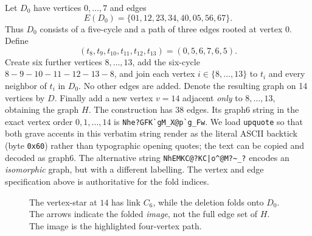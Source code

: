 \documentclass[11pt,letterpaper]{article}
\theoremstyle{definition}
\theoremstyle{remark}
\begin{document}
Let \(D_0\) have vertices \(0,\ldots,7\) and edges
\[
 E(D_0)=\{01,12,23,34,40,05,56,67\}.
\]
Thus \(D_0\) consists of a five-cycle and a path of three edges rooted at vertex \(0\). Define
\[
 (t_8,t_9,t_{10},t_{11},t_{12},t_{13})=(0,5,6,7,6,5).
\]
Create six further vertices \(8,\ldots,13\), add the six-cycle \(8-9-10-11-12-13-8\), and join each vertex \(i\in\{8,\ldots,13\}\) to \(t_i\) and every neighbor of \(t_i\) in \(D_0\). No other edges are added. Denote the resulting graph on 14 vertices by \(D\). Finally add a new vertex \(v=14\) adjacent \emph{only} to \(8,\ldots,13\), obtaining the graph \(H\). The construction has \(38\) edges. Its graph6 string in the exact vertex
order \(0,1,\ldots,14\) is \verb!Nhe?GFK`gM_X@p`g_Fw!.
We load \texttt{upquote} so that both grave accents in this
verbatim string render as the literal ASCII backtick (byte \texttt{0x60})
rather than typographic opening quotes; the text can be copied and
decoded as graph6.
The alternative string \verb!NhEMKC@?KC|o^@M?~_?! encodes an
\emph{isomorphic} graph, but with a different labelling. The vertex
and edge specification above is authoritative for the fold indices.

\begin{figure}[htbp]
\centering
{}
\caption{The vertex-star at \(14\) has link \(C_6\), while the deletion folds onto \(D_0\). The arrows indicate the folded \emph{image}, not the full edge set of \(H\). The image is the highlighted four-vertex path.}
\label{fig:example}
\end{figure}
\end{document}
